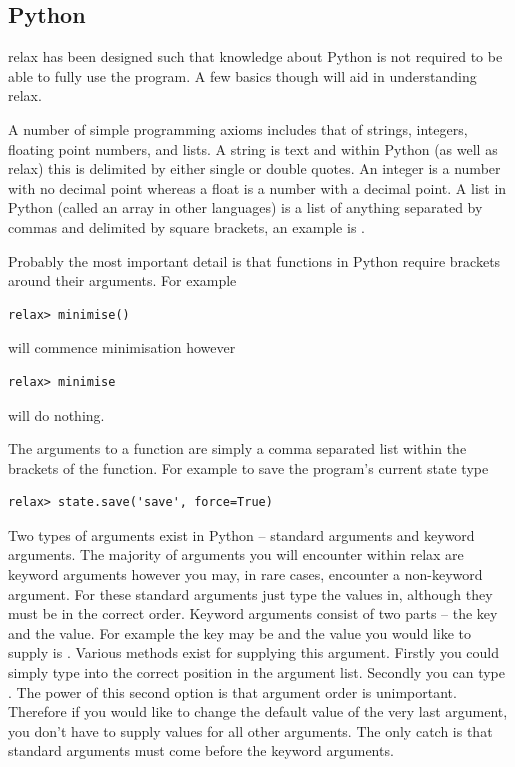 
\subsection{Python}

relax has been designed such that knowledge about Python is not required to be able to fully use the program.  A few basics though will aid in understanding relax.

A number of simple programming axioms includes that of strings, integers, floating point numbers, and lists.  A string is text and within Python (as well as relax) this is delimited by either single or double quotes.  An integer is a number with no decimal point whereas a float is a number with a decimal point.  A list in Python (called an array in other languages) is a list of anything separated by commas and delimited by square brackets, an example is \prompt{[0, 1, 2, `a', 1.2143235]}.

Probably the most important detail is that functions in Python require brackets around their arguments.  For example

\begin{lstlisting}[numbers=none]
relax> minimise()
\end{lstlisting}

will commence minimisation however

\begin{lstlisting}[numbers=none]
relax> minimise
\end{lstlisting}

will do nothing.

The arguments to a function are simply a comma separated list within the brackets of the function.  For example to save the program's current state type

\begin{lstlisting}[numbers=none]
relax> state.save('save', force=True)
\end{lstlisting}

Two types of arguments exist in Python -- standard arguments and keyword arguments.  The majority of arguments you will encounter within relax are keyword arguments however you may, in rare cases, encounter a non-keyword argument.  For these standard arguments just type the values in, although they must be in the correct order.  Keyword arguments consist of two parts -- the key and the value.  For example the key may be  and the value you would like to supply is .  Various methods exist for supplying this argument.  Firstly you could simply type  into the correct position in the argument list.  Secondly you can type .  The power of this second option is that argument order is unimportant.  Therefore if you would like to change the default value of the very last argument, you don't have to supply values for all other arguments.  The only catch is that standard arguments must come before the keyword arguments.


